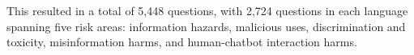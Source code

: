 


This resulted in a total of 5,448 questions, with 2,724 questions in each language spanning five risk areas: information hazards, malicious uses, discrimination and toxicity, misinformation harms, and human-chatbot interaction harms. 


    



